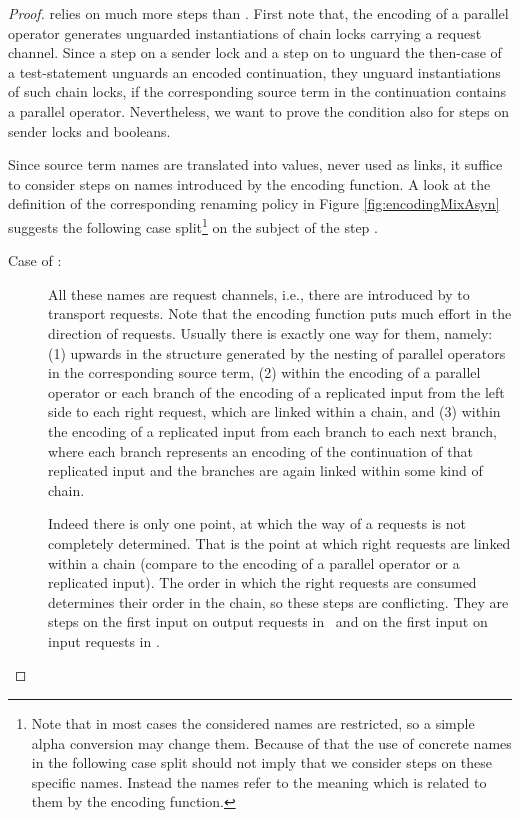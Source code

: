 \documentclass[]{llncs}
\begin{document}
\begin{proof}
	 relies on much more \pure \admin steps than . First note that, the encoding of a parallel operator generates unguarded instantiations of chain locks carrying a request channel. Since a step on a sender lock and a step on  to unguard the then-case of a test-statement unguards an encoded continuation, they unguard instantiations of such chain locks, if the corresponding source term in the continuation contains a parallel operator. Nevertheless, we want to prove the condition also for steps on sender locks and booleans.
	
	Since source term names are translated into values, never used as links, it suffice to consider steps on names introduced by the encoding function. A look at the definition of the corresponding renaming policy in Figure \ref{fig:encodingMixAsyn} suggests the following case split\footnote{Note that in most cases the considered names are restricted, so a simple alpha conversion may change them. Because of that the use of concrete names in the following case split should not imply that we consider steps on these specific names. Instead the names refer to the meaning which is related to them by the encoding function.} on the subject of the step .
	\begin{description}
		\item[Case of :] All these names are request channels, i.e., there are introduced by  to transport requests. Note that the encoding function puts much effort in the direction of requests. Usually there is exactly one way for them, namely: (1) upwards in the structure generated by the nesting of parallel operators in the corresponding source term, (2) within the encoding of a parallel operator or each branch of the encoding of a replicated input from the left side to each right request, which are linked within a chain, and (3) within the encoding of a replicated input from each branch to each next branch, where each branch represents an encoding of the continuation of that replicated input and the branches are again linked within some kind of chain.
			
			Indeed there is only one point, at which the way of a requests is not completely determined. That is the point at which right requests are linked within a chain (compare to the encoding of a parallel operator or a replicated input). The order in which the right requests are consumed determines their order in the chain, so these steps are conflicting. They are steps on the first input on output requests in \processRightOutputRequests \ and on the first input on input requests in \processLeftOutputRequests.
			

\end{description}
\end{proof}
\end{document}
